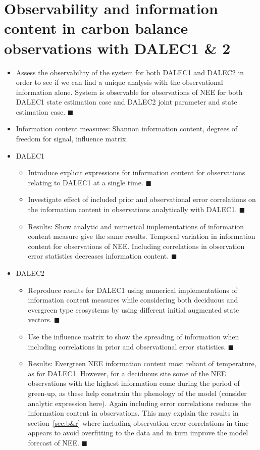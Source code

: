 \documentclass[11pt]{article}
\begin{document}
\section{Observability and information content in carbon balance observations with DALEC1 \& 2} \label{sec:ic}
\begin{itemize}
\item Assess the observability of the system for both DALEC1 and DALEC2 in order to see if we can find a unique analysis with the observational information alone. System is observable for observations of NEE for both DALEC1 state estimation case and DALEC2 joint parameter and state estimation case. {\color{green} $\blacksquare$}
\item Information content measures: Shannon information content, degrees of freedom for signal, influence matrix.
\item DALEC1
\begin{itemize}
\item Introduce explicit expressions for information content for observations relating to DALEC1 at a single time. {\color{green} $\blacksquare$}
\item Investigate effect of included prior and observational error correlations on the information content in observations analytically with DALEC1. {\color{green} $\blacksquare$}
\item Results: Show analytic and numerical implementations of information content measure give the same results. Temporal variation in information content for observations of NEE. Including correlations in observation error statistics decreases information content. {\color{green} $\blacksquare$}
\end{itemize}
\item DALEC2
\begin{itemize}
\item Reproduce results for DALEC1 using numerical implementations of information content measures while considering both deciduous and evergreen type ecosystems by using different initial augmented state vectors. {\color{yellow} $\blacksquare$}
\item Use the influence matrix to show the spreading of information when including correlations in prior and observational error statistics. {\color{yellow} $\blacksquare$}
\item Results: Evergreen NEE information content most reliant of temperature, as for DALEC1. However, for a deciduous site some of the NEE observations with the highest information come during the period of green-up, as these help constrain the phenology of the model (consider analytic expression here). Again including error correlations reduces the information content in observations. This may explain the results in section~\ref{sec:b&r} where including observation error correlations in time appears to avoid overfitting to the data and in turn improve the model forecast of NEE. {\color{yellow} $\blacksquare$}

\end{itemize}
\end{itemize}
\end{document}

